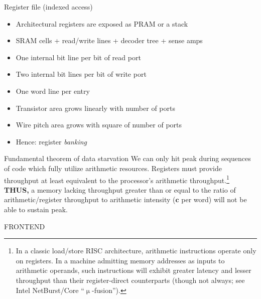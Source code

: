 \documentclass[mathserif,xcolor={dvipsnames,table}]{beamer}
\begin{document}
\begin{frame}{Register file (indexed access)}
\begin{itemize}
\item Architectural registers are exposed as PRAM or a stack
\item SRAM cells + read/write lines + decoder tree + sense amps
\item One internal bit line per bit of read port
\item Two internal bit lines per bit of write port
\item One word line per entry
\item Transistor area grows linearly with number of ports
\item Wire pitch area grows with square of number of ports
\item Hence: register \textit{banking}
\end{itemize}
\end{frame}

\begin{frame}{Fundamental theorem of data starvation}
We can only hit peak during sequences of code which fully
utilize arithmetic resources. Registers must provide throughput
at least equivalent to the processor's arithmetic throughput.\footnote{\tiny{In a classic load/store RISC architecture, arithmetic instructions operate
only on registers. In a machine admitting memory addresses as inputs to
arithmetic operands, such instructions will exhibit greater latency and lesser throughput
than their register-direct counterparts (though not always; see Intel NetBurst/Core ``$\upmu$-fusion'').}}\\
\vspace{.35in}
\textbf{THUS,} a memory lacking throughput greater than or equal to the ratio of
arithmetic/register throughput to arithmetic intensity ($\textbf{c}$ per word) will not be able
to sustain peak.
\end{frame}

\begin{frame}
\huge{FRONTEND}
\end{frame}
\end{document}
